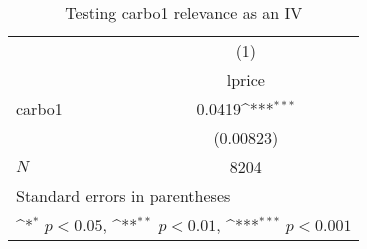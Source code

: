 \begin{table}[htbp]\centering
\def\sym#1{\ifmmode^{#1}\else\(^{#1}\)\fi}
\caption{Testing carbo1 relevance as an IV}
\begin{tabular}{l*{1}{c}}
\hline\hline
            &\multicolumn{1}{c}{(1)}\\
            &\multicolumn{1}{c}{lprice}\\
\hline
carbo1      &      0.0419\sym{***}\\
            &   (0.00823)         \\
\hline
\(N\)       &        8204         \\
\hline\hline
\multicolumn{2}{l}{\footnotesize Standard errors in parentheses}\\
\multicolumn{2}{l}{\footnotesize \sym{*} \(p<0.05\), \sym{**} \(p<0.01\), \sym{***} \(p<0.001\)}\\
\end{tabular}
\end{table}
